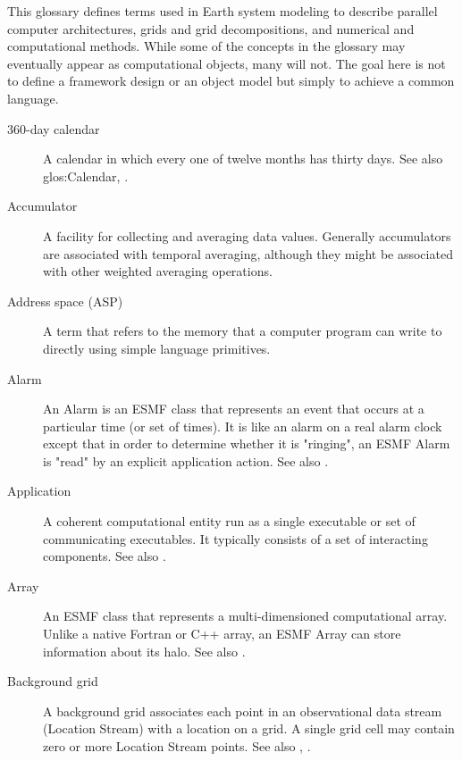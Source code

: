 
\label{sec:glos}

This glossary defines terms used in Earth system modeling to describe 
parallel computer architectures, grids and grid decompositions, and 
numerical and computational methods.  While some of the concepts in 
the glossary may eventually appear as computational objects, many 
will not.  The goal here is not to define a framework design or an 
object model but simply to achieve a common language.

\begin{description}

\item[360-day calendar] \label{glos:360DayCal} A calendar in which 
  every one of twelve months has thirty days.  See also 
  {glos:Calendar}, .

\item[Accumulator] \label{glos:Accumulator} A facility for collecting 
  and averaging data values.  Generally accumulators are associated with 
  temporal averaging, although they might be associated with 
  other weighted averaging operations.    
  
\item[Address space (ASP)] \label{glos:ASP} A term that refers to 
  the memory that a computer program can write to directly using
  simple language primitives. 

\item[Alarm] \label{glos:Alarm} An Alarm is an ESMF class that represents
  an event that occurs at a particular 
  time (or set of times).  It is like an alarm on a real alarm clock 
  except that in order to determine whether it is "ringing", an ESMF Alarm 
  is "read" by an explicit application action.
  See also .

\item[Application] \label{glos:Application} A coherent computational 
  entity run as a single executable or set of communicating executables.  
  It typically consists of a set of interacting components.  
  See also .

\item[Array] \label{glos:Array} An ESMF class that represents a multi-dimensioned
  computational array.  Unlike a native Fortran or C++ array, an ESMF Array can store information about its halo.  See also .

\item[Background grid] \label{glos:BackGrid} 
  A background grid associates each point in an observational data stream 
  (Location Stream) with a location on a grid. A single grid cell may contain 
  zero or more Location Stream points. See also , . 


\end{description}
